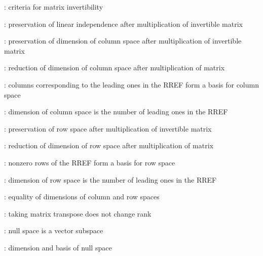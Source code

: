 \item {}: criteria for matrix invertibility
\item {}: preservation of linear independence after multiplication of invertible matrix
\item {}: preservation of dimension of column space after multiplication of invertible matrix
\item {}: reduction of dimension of column space after multiplication of matrix
\item {}: columns corresponding to the leading ones in the RREF form a basis for column space
\item {}: dimension of column space is the number of leading ones in the RREF
\item {}: preservation of row space after multiplication of invertible matrix
\item {}: reduction of dimension of row space after multiplication of matrix
\item {}: nonzero rows of the RREF form a basis for row space
\item {}: dimension of row space is the number of leading ones in the RREF
\item {}: equality of dimensions of column and row spaces
\item {}: taking matrix transpose does not change rank
\item {}: null space is a vector subspace
\item {}: dimension and basis of null space
